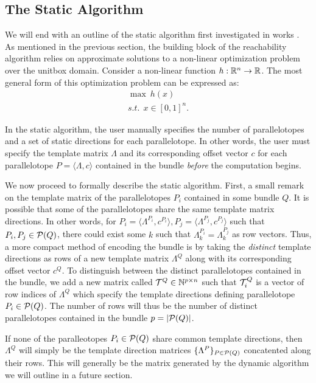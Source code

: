\subsection{The Static Algorithm}
\label{sec:static}

We will end with an outline of the static algorithm first investigated in works \cite{dang2012reachability, dreossi2016parallelotope}. As mentioned in the previous section, the building block of the reachability algorithm relies on approximate solutions to a non-linear optimization problem over the unitbox domain. Consider a non-linear function $h : {\mathbb{R}}^n \rightarrow {\mathbb{R}}$. The most general form of this optimization problem can be expressed as:
%
\begin{eqnarray}
  \max ~ h(x) \label{eq:maxsup}\\
  s.t. ~~ x \in [0,1]^{n}.\nonumber
\end{eqnarray}

In the static algorithm, the user manually specifies the number of parallelotopes and a set of static directions for each parallelotope. In other words, the user must specify the template matrix $\Lambda$ and its corresponding offset vector $c$ for each parallelotope $P = \langle \Lambda, c\rangle$ contained in the bundle \emph{before} the computation begins.

We now proceed to formally describe the static algorithm.
%
First, a small remark on the template matrix of the parallelotopes $P_i$ contained in some bundle $Q$. It is possible that some of the parallelotopes share the same template matrix directions.
%
 In other words, for $P_i = \langle \Lambda^{P_i}, c^{P_i} \rangle, P_j = \langle \Lambda^{P_j}, c^{P_j} \rangle$ such that $P_i, P_j \in \mathcal{P}(Q)$, there could exist some $k$ such that $\Lambda^{P_i}_k = \Lambda^{P_j}_k$ as row vectors.
%
Thus, a more compact method of encoding the bundle is by taking the \emph{distinct} template directions as rows of a new template matrix $\Lambda^Q$ along with its corresponding offset vector $c^Q$.
%
To distinguish between the distinct parallelotopes contained in the bundle, we add a new matrix called $\mathcal{T}^Q \in \mathbb{N}^{p \times n}$ such that $\mathcal{T}^Q_i$ is a vector of row indices of $\Lambda^Q$ which specify the template directions defining parallelotope $P_i \in \mathcal{P}(Q)$.
%
The number of rows will thus be the number of distinct parallelotopes contained in the bundle $p = |\mathcal{P}(Q)|$.
%
\begin{remark}
If none of the paralleotopes $P_i \in \mathcal{P}(Q)$ share common template directions, then $\Lambda^Q$ will simply be the template direction matrices $\{\Lambda^P\}_{P \in \mathcal{P}(Q)}$ concatented along their rows. This will generally be the matrix generated by the dynamic algorithm we will outline in a future section.
\end{remark}
%
\begin{example}

\end{example}

